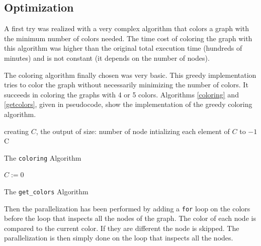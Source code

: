 \documentclass[fleqn,11pt]{SelfArx} %
\theoremstyle{definition}
\begin{document}
\subsection{Optimization}

A first try was realized with a very complex algorithm that colors a graph with the minimum number of colors needed. The time cost of coloring the graph with this algorithm was higher than the original total execution time (hundreds of minutes) and is not constant (it depends on the number of nodes).

The coloring algorithm finally chosen was very basic. This greedy implementation tries to color the graph without necessarily minimizing the number of colors. It succeeds in coloring the graphs with 4 or 5 colors. Algorithms \ref{coloring} and \ref{getcolors}, given in pseudocode, show the implementation of the greedy coloring algorithm.

\begin{algorithm}[h]

\BlankLine

creating $C$, the output of size: number of node\;
intializing each element of $C$ to $-1$\;
\Return C\;

\caption{The \texttt{coloring} Algorithm}
\label{coloring}
\end{algorithm}

\begin{algorithm}[h]
\SetAlgoLined
{}

\BlankLine

$C := 0$\;

\caption{The \texttt{get\_colors} Algorithm}
\label{getcolors}
\end{algorithm}

Then the parallelization has been performed by adding a \verb+for+ loop on the colors before the loop that inspects all the nodes of the graph. The color of each node is compared to the current color. If they are different the node is skipped. The parallelization is then simply done on the loop that inspects all the nodes.
\end{document}

